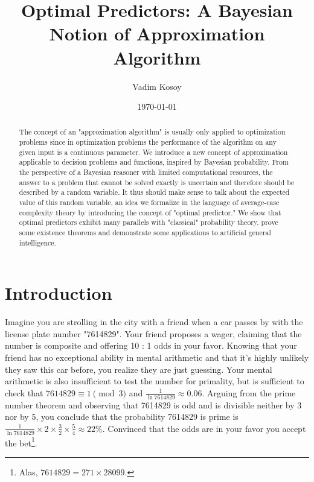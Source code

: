 \documentclass{article}
\theoremstyle{definition}
\theoremstyle{plain}
\begin{document}
\title{Optimal Predictors: A Bayesian Notion of Approximation Algorithm}


\author{Vadim Kosoy}



\date{\today}



\maketitle

\begin{abstract}
The concept of an "approximation algorithm" is usually only applied to optimization problems since in optimization problems the performance of the algorithm on any given input is a continuous parameter. We introduce a new concept of approximation applicable to decision problems and functions, inspired by Bayesian probability. From the perspective of a Bayesian reasoner with limited computational resources, the answer to a problem that cannot be solved exactly is uncertain and therefore should be described by a random variable. It thus should make sense to talk about the expected value of this random variable, an idea we formalize in the language of average-case complexity theory by introducing the concept of "optimal predictor." We show that optimal predictors exhibit many parallels with "classical" probability theory, prove some existence theorems and demonstrate some applications to artificial general intelligence.%
\end{abstract}%



\section*{Introduction}
%
Imagine you are strolling in the city with a friend when a car passes by with the license plate number "7614829". Your friend proposes a wager, claiming that the number is composite and offering 10 : 1 odds in your favor. Knowing that your friend has no exceptional ability in mental arithmetic and that it's highly unlikely they saw this car before, you realize they are just guessing. Your mental arithmetic is also insufficient to test the number for primality, but is sufficient to check that $7614829 \equiv 1 \pmod{3}$ and $\frac{1}{\ln 7614829} \approx 0.06$. Arguing from the prime number theorem and observing that 7614829 is odd and is divisible neither by 3 nor by 5, you conclude that the probability 7614829 is prime is $\frac{1}{\ln 7614829} \times 2 \times \frac{3}{2} \times \frac{5}{4} \approx 22\%$. Convinced that the odds are in your favor you accept the bet\footnote{Alas, $7614829 = 271 \times 28099$.}.
\end{document}
